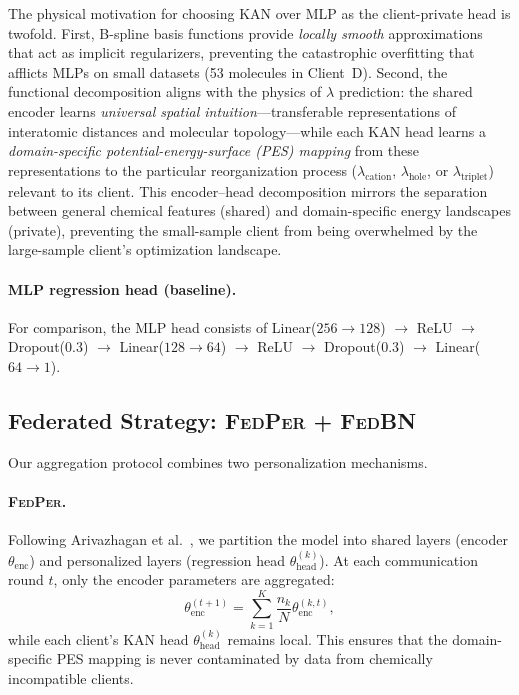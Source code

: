 \documentclass[twocolumn]{article}
\newcommand{\lam}{\lambda}
\newcommand{\lamhole}{\lambda_{\text{hole}}}
\newcommand{\lamcat}{\lambda_{\text{cation}}}
\newcommand{\lamtrip}{\lambda_{\text{triplet}}}
\newcommand{\thetaenc}{\theta_{\text{enc}}}
\newcommand{\thetahead}{\theta_{\text{head}}}
\newcommand{\FedPer}{\textsc{FedPer}}
\newcommand{\FedBN}{\textsc{FedBN}}
\begin{document}
The physical motivation for choosing KAN over MLP as the client-private head is twofold.
First, B-spline basis functions provide \emph{locally smooth} approximations that act as implicit regularizers, preventing the catastrophic overfitting that afflicts MLPs on small datasets (53 molecules in Client~D).
Second, the functional decomposition aligns with the physics of $\lam$ prediction: the shared encoder learns \emph{universal spatial intuition}---transferable representations of interatomic distances and molecular topology---while each KAN head learns a \emph{domain-specific potential-energy-surface (PES) mapping} from these representations to the particular reorganization process ($\lamcat$, $\lamhole$, or $\lamtrip$) relevant to its client.
This encoder--head decomposition mirrors the separation between general chemical features (shared) and domain-specific energy landscapes (private), preventing the small-sample client from being overwhelmed by the large-sample client's optimization landscape.

\paragraph{MLP regression head (baseline).}
For comparison, the MLP head consists of Linear($256 \to 128$) $\to$ ReLU $\to$ Dropout(0.3) $\to$ Linear($128 \to 64$) $\to$ ReLU $\to$ Dropout(0.3) $\to$ Linear($64 \to 1$).

\subsection{Federated Strategy: \FedPer{} + \FedBN{}}\label{sec:fedstrategy}

Our aggregation protocol combines two personalization mechanisms.

\paragraph{\FedPer{}.}
Following Arivazhagan et al.~\cite{Arivazhagan2019_FedPer}, we partition the model into shared layers (encoder $\thetaenc$) and personalized layers (regression head $\thetahead^{(k)}$).
At each communication round $t$, only the encoder parameters are aggregated:
\begin{equation}
  \thetaenc^{(t+1)} = \sum_{k=1}^{K} \frac{n_k}{N} \thetaenc^{(k,t)},
\end{equation}
while each client's KAN head $\thetahead^{(k)}$ remains local.
This ensures that the domain-specific PES mapping is never contaminated by data from chemically incompatible clients.
\end{document}
